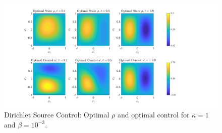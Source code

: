 \documentclass[11pt, a4paper]{article}
\theoremstyle{definition}
\begin{document}
	\begin{figure}[h]
		\centering
		\includegraphics[scale=0.35]{SCEx2k1.png}
		\caption{Dirichlet Source Control: Optimal $\rho$ and optimal control for $\kappa = 1$ and $\beta = 10^{-3}$.} 
		\label{F2c}
	\end{figure}
	
\end{document}
